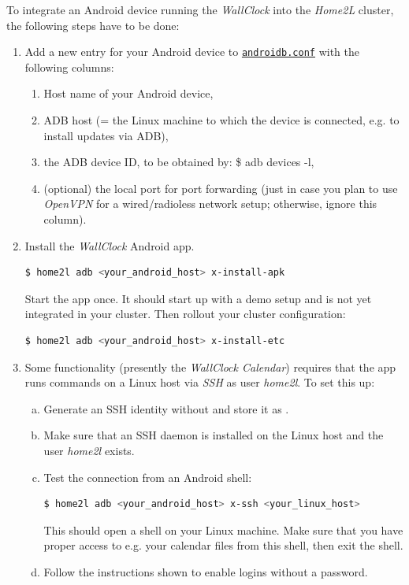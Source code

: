 \documentclass[12pt,english,parskip=half,headheight=19pt]{scrreprt}
\newcommand{\lstf}[1]{\colorbox{lstbackground}{\ttfamily\footnotesize#1}}
\newcommand{\idx}[1]{#1\index{#1}}
\newcommand{\reftool}[1]{\hyperref[tool:#1]{\texttt{\idx{#1}}}}
\begin{document}
To integrate an Android device running the \textit{WallClock} into the \textit{Home2L} cluster, the following steps have to be done:

\begin{enumerate}
  \item Add a new entry for your Android device to \reftool{androidb.conf} with the following columns:
    \begin{enumerate}
      \item Host name of your Android device,
      \item ADB host (= the Linux machine to which the device is connected, e.g. to install updates via ADB),
      \item the ADB device ID, to be obtained by: \lstf{\$ adb devices -l},
      \item (optional) the local port for port forwarding (just in case you plan to use \textit{OpenVPN} for a wired/radioless network setup; otherwise, ignore this column).
    \end{enumerate}

  \item Install the \textit{WallClock} Android app.
    \begin{lstlisting}[language=bash]
      $ home2l adb <your_android_host> x-install-apk
    \end{lstlisting}
    Start the app once. It should start up with a demo setup and is not yet integrated in your cluster.
    Then rollout your cluster configuration:
    \begin{lstlisting}[language=bash]
      $ home2l adb <your_android_host> x-install-etc
    \end{lstlisting}

  \item Some functionality (presently the \textit{WallClock Calendar}) requires that the app runs commands on a Linux host via \textit{SSH} as user \textit{home2l}. To set this up:
    \begin{enumerate}[a)]
      \item Generate an SSH identity without and store it as
            .
      \item Make sure that an SSH daemon is installed on the Linux host and the user \textit{home2l} exists.
      \item Test the connection from an Android shell:
        \begin{lstlisting}[language=bash]
          $ home2l adb <your_android_host> x-ssh <your_linux_host>
        \end{lstlisting}
        This should open a shell on your Linux machine. Make sure that you have proper access
        to e.g. your calendar files from this shell, then exit the shell.
      \item Follow the instructions shown to enable logins without a password.
    \end{enumerate}
\end{enumerate}
\end{document}
